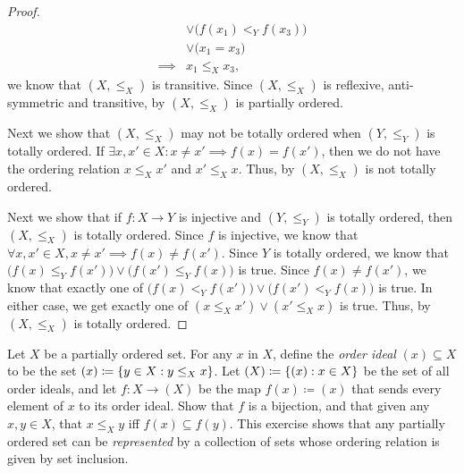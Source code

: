 \begin{proof}
\begin{align*}
             & \lor \big(f(x_1) <_Y f(x_3)\big)                                                                                                    \\
             & \lor \big(x_1 = x_3\big)                                                                                                            \\
    \implies & x_1 \leq_X x_3,
  \end{align*}
  we know that \((X, \leq_X)\) is transitive.
  Since \((X, \leq_X)\) is reflexive, anti-symmetric and transitive, by  \((X, \leq_X)\) is partially ordered.

  Next we show that \((X, \leq_X)\) may not be totally ordered when \((Y, \leq_Y)\) is totally ordered.
  If \(\exists x, x' \in X : x \neq x' \implies f(x) = f(x')\), then we do not have the ordering relation \(x \leq_X x'\) and \(x' \leq_X x\).
  Thus, by  \((X, \leq_X)\) is not totally ordered.

  Next we show that if \(f : X \to Y\) is injective and \((Y, \leq_Y)\) is totally ordered, then \((X, \leq_X)\) is totally ordered.
  Since \(f\) is injective, we know that \(\forall x, x' \in X, x \neq x' \implies f(x) \neq f(x')\).
  Since \(Y\) is totally ordered, we know that \(\big(f(x) \leq_Y f(x')\big) \lor \big(f(x') \leq_Y f(x)\big)\) is true.
  Since \(f(x) \neq f(x')\), we know that exactly one of \(\big(f(x) <_Y f(x')\big) \lor \big(f(x') <_Y f(x)\big)\) is true.
  In either case, we get exactly one of \((x \leq_X x') \lor (x' \leq_X x)\) is true.
  Thus, by  \((X, \leq_X)\) is totally ordered.
\end{proof}

\begin{ex}\label{i:ex:8.5.6}
  Let \(X\) be a partially ordered set.
  For any \(x\) in \(X\), define the \emph{order ideal} \((x) \subseteq X\) to be the set \((x) \coloneqq \left\lbrace y \in X : y \leq_X x\right\rbrace\).
  Let \((X) \coloneqq \left\lbrace(x) : x \in X\right\rbrace\) be the set of all order ideals, and let \(f : X \to (X)\) be the map \(f(x) \coloneqq (x)\) that sends every element of \(x\) to its order ideal.
  Show that \(f\) is a bijection, and that given any \(x, y \in X\), that \(x \leq_X y\) iff \(f(x) \subseteq f(y)\).
  This exercise shows that any partially ordered set can be \emph{represented} by a collection of sets whose ordering relation is given by set inclusion.
\end{ex}

